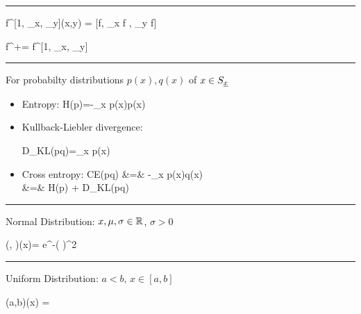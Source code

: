 \hrule 

\beq
f^{[1, \partial_x, \partial_y]}(x,y) =
[f, \partial_x f , \partial_y f]
\eeq

\beq
f^+=
f^{[1, \partial_x, \partial_y]}
\eeq
\hrule
For probabilty distributions $p(x), q(x)$ of $x\in S_{\underline{x}}$
\begin{itemize}
\item 
Entropy:
\beq
H(p)=-\sum_x p(x)\log p(x)
\eeq

\item
Kullback-Liebler divergence:

\beq
D_{KL}(p\parallel q)=\sum_{x} p(x)\log {}
\eeq
\item 
Cross entropy:
\beqa
CE(p\rarrow q) &=& -\sum_x p(x)\log q(x)\\
&=& H(p) + D_{KL}(p\parallel q)
\eeqa
\end{itemize}

\hrule
Normal Distribution: $x, \mu, \sigma\in { \mathbb{R}}$, $\sigma >0$

\beq 
\caln(\mu, \sigma)(x)=
e^{-\left(
\right)^2}
\eeq
\hrule
Uniform Distribution: $a<b$, $x\in [a,b]$

\beq
\calu(a,b)(x) =
\eeq